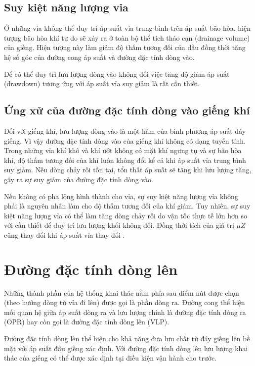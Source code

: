 \documentclass[12pt,a4paper]{report}
\begin{document}
\subsection{Suy kiệt năng lượng vỉa}

Ở những vỉa không thể duy trì áp suất vỉa trung bình trên áp suất bão hòa, hiện tượng bão hòa khí tự do sẽ xảy ra ở toàn bộ thể tích tháo cạn (drainage volume) của giếng. Hiện tượng này làm giảm độ thấm tương đối của dầu đồng thời tăng hệ số góc của đường cong áp suất và đường đặc tính dòng vào.

Để có thể duy trì lưu lượng dòng vào không đổi việc tăng độ giảm áp suất (drawdown) tương ứng với áp suất vỉa suy giảm là rất cần thiết.\\

\subsection{Ứng xử của đường đặc tính dòng vào giếng khí}

Đối với giếng khí, lưu lượng dòng vào là một hàm của bình phương áp suất đáy giếng. Vì vậy đường đặc tính dòng vào của giếng khí không có dạng tuyến tính. Trong những vỉa khí khô và khí ướt không có mặt khí ngưng tụ và sự bão hòa khí, độ thấm tương đối của khí luôn không đổi kể cả khi áp suất vỉa trung bình suy giảm. Nếu dòng chảy rối tồn tại, tổn thất áp suất sẽ tăng khi lưu lượng tăng, gây ra sự suy giảm của đường đặc tính dòng vào.

Nếu không có pha lỏng hình thành cho vỉa, sự suy kiệt năng lượng vỉa không phải là nguyên nhân làm cho độ thấm tương đối của khí giảm. Tuy nhiên, sự suy kiệt năng lượng vỉa có thể làm tăng dòng chảy rối do vận tốc thực tế lớn hơn so với cần thiết để duy trì lưu lượng khối không đổi. Đồng thời tích của giá trị $\mu Z$  cũng thay đổi khi áp suất vỉa thay đổi \cite{dale1991production}.

\section{Đường đặc tính dòng lên}

Những thành phần của hệ thống khai thác nằm phía sau điểm nút được chọn (theo hướng dòng từ vỉa đi lên) được gọi là phần dòng ra. Đường cong thể hiện mối quan hệ giữa áp suất dòng ra và lưu lượng chính là đường đặc tính dòng ra (OPR) hay còn gọi là đường đặc tính dòng lên (VLP).

Đường đặc tính dòng lên thể hiện cho khả năng đưa lưu chất từ đáy giếng lên bề mặt với áp suất đầu giếng xác định. Với đường đặc tính dòng lên lưu lượng khai thác của giếng có thể được xác định tại điều kiện vận hành cho trước.
\end{document}
